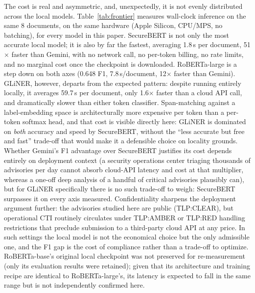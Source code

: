 \documentclass[11pt]{article}
\begin{document}
The cost is real and asymmetric, and, unexpectedly, it is not evenly
distributed across the local models. Table~\ref{tab:frontier} measures
wall-clock inference on the same 8 documents, on the same hardware (Apple
Silicon, CPU/MPS, no batching), for every model in this paper. SecureBERT
is not only the most accurate local model; it is also by far the fastest,
averaging 1.8\,s per document, 51$\times$ faster than Gemini, with no
network call, no per-token billing, no rate limits, and no marginal cost
once the checkpoint is downloaded. RoBERTa-large is a step down on both
axes (0.648 F1, 7.8\,s/document, 12$\times$ faster than Gemini). GLiNER,
however, departs from the expected pattern: despite running entirely
locally, it averages 59.7\,s per document, only 1.6$\times$ faster than a
cloud API call, and dramatically slower than either token classifier.
Span-matching against a label-embedding space is architecturally more
expensive per token than a per-token softmax head, and that cost is visible
directly here: GLiNER is dominated on \emph{both} accuracy and speed by
SecureBERT, without the ``less accurate but free and fast'' trade-off that
would make it a defensible choice on locality grounds. Whether Gemini's F1
advantage over SecureBERT justifies its cost depends entirely on deployment
context (a security operations center triaging thousands of advisories
per day cannot absorb cloud-API latency and cost at that multiplier,
whereas a one-off deep analysis of a handful of critical advisories
plausibly can), but for GLiNER specifically there is no such trade-off to
weigh: SecureBERT surpasses it on every axis measured. Confidentiality
sharpens the deployment argument further: the advisories studied here are
public (TLP:CLEAR), but operational CTI routinely circulates under
TLP:AMBER or TLP:RED handling restrictions that preclude submission to a
third-party cloud API at any price. In such settings the local model is
not the economical choice but the only admissible one, and the F1 gap is
the cost of compliance rather than a trade-off to optimize. RoBERTa-base's
original local checkpoint was not preserved for re-measurement (only its
evaluation results were retained); given that its architecture and training
recipe are identical to RoBERTa-large's, its latency is expected to fall in
the same range but is not independently confirmed here.
\end{document}
